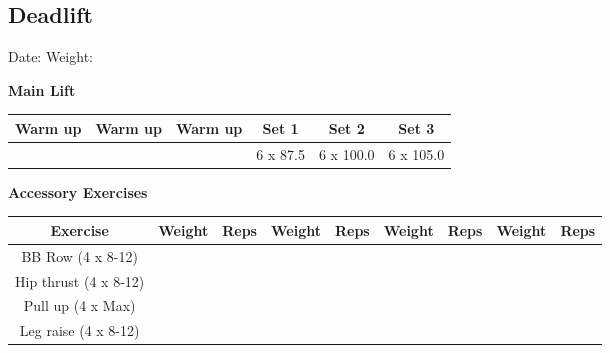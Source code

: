 \documentclass{article}%
\begin{document}
\subsection*{Deadlift}%
Date: %
\linebreak%
Weight: %
\vspace*{20pt}%
\linebreak%
\begin{minipage}{0.5\textwidth}%
\textbf{Main Lift\newline%
\newline%
}%
\begin{tabular}{|c|c|c|c|c|c|}%
\hline%
Warm up&Warm up&Warm up&Set 1&Set 2&Set 3\\%
\hline%
&&&6 x 87.5&6 x 100.0&6 x 105.0\\%
\hline%
\end{tabular}%
\vspace*{20pt}%
\linebreak%
\textbf{Accessory Exercises\newline%
\newline%
}%
\begin{tabular}{|c|c|c|c|c|c|c|c|c|}%
\hline%
Exercise&Weight&Reps&Weight&Reps&Weight&Reps&Weight&Reps\\%
\hline%
BB Row (4 x 8{-}12)&&&&&&&&\\%
\hline%
Hip thrust (4 x 8{-}12)&&&&&&&&\\%
\hline%
Pull up (4 x Max)&&&&&&&&\\%
\hline%
Leg raise (4 x 8{-}12)&&&&&&&&\\%
\hline%
\end{tabular}%
\end{minipage}%
\vspace*{20pt}%
\linebreak

%
\end{document}
